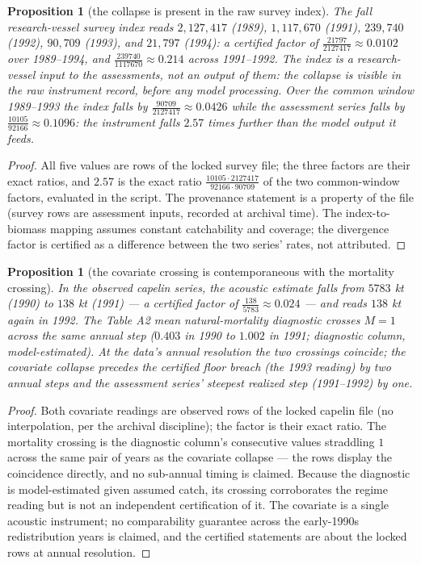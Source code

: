 \documentclass[10pt,twocolumn]{article}
\theoremstyle{plain}
\newtheorem{proposition}[theorem]{Proposition}
\theoremstyle{remark}
\begin{document}
\begin{proposition}[the collapse is present in the raw survey index]
\label{prop:survey}
The fall research-vessel survey index reads \(2{,}127{,}417\) (1989),
\(1{,}117{,}670\) (1991), \(239{,}740\) (1992), \(90{,}709\) (1993),
and \(21{,}797\) (1994): a certified factor of
\(\tfrac{21797}{2127417} \approx 0.0102\) over 1989--1994, and
\(\tfrac{239740}{1117670} \approx 0.214\) across 1991--1992. The index
is a research-vessel input to the assessments, not an output of them:
the collapse is visible in the raw instrument record, before any model
processing. Over the common window 1989--1993 the index falls by
\(\tfrac{90709}{2127417} \approx 0.0426\) while the assessment series
falls by \(\tfrac{10105}{92166} \approx 0.1096\): the instrument falls
\(2.57\) times further than the model output it feeds.
\end{proposition}

\begin{proof}
All five values are rows of the locked survey file; the three factors
are their exact ratios, and \(2.57\) is the exact ratio
\(\tfrac{10105 \cdot 2127417}{92166 \cdot 90709}\) of the two
common-window factors, evaluated in the script. The provenance
statement is a property of the file (survey rows are assessment
inputs, recorded at archival time). The index-to-biomass mapping
assumes constant catchability and coverage; the divergence factor is
certified as a difference between the two series' rates, not attributed.
\end{proof}

\begin{proposition}[the covariate crossing is contemporaneous with the
mortality crossing]\label{prop:capelin}
In the observed capelin series, the acoustic estimate falls from
\(5783\) kt (1990) to \(138\) kt (1991) --- a certified factor of
\(\tfrac{138}{5783} \approx 0.024\) --- and reads \(138\) kt again in
1992. The Table A2 mean natural-mortality diagnostic crosses
\(M = 1\) across the same annual step (\(0.403\) in 1990 to \(1.002\)
in 1991; diagnostic column, model-estimated). At the data's annual
resolution the two crossings coincide; the covariate collapse precedes
the certified floor breach (the 1993 reading) by two annual steps and
the assessment series' steepest realized step (1991--1992) by one.
\end{proposition}

\begin{proof}
Both covariate readings are observed rows of the locked capelin file
(no interpolation, per the archival discipline); the factor is their
exact ratio. The mortality crossing is the diagnostic column's
consecutive values straddling \(1\) across the same pair of years as
the covariate collapse --- the rows display the coincidence directly,
and no sub-annual timing is claimed. Because the diagnostic is
model-estimated given assumed catch, its crossing corroborates the
regime reading but is not an independent certification of it. The
covariate is a single acoustic instrument; no comparability guarantee
across the early-1990s redistribution years is claimed, and the
certified statements are about the locked rows at annual resolution.
\end{proof}
\end{document}
